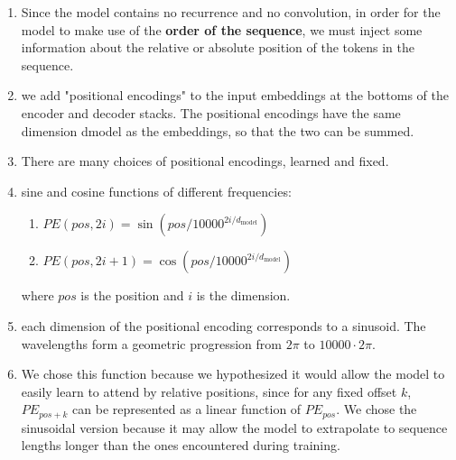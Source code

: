 \begin{enumerate}
    \item Since the model contains no recurrence and no convolution, in order for the model to make use of the \textbf{order of the sequence}, we must inject some information about the relative or absolute position of the tokens in the sequence.
    \hfill \cite{arxiv/1706.03762/Attention-Is-All-You-Need}

    \item we add "positional encodings" to the input embeddings at the bottoms of the encoder and decoder stacks.
    The positional encodings have the same dimension dmodel as the embeddings, so that the two can be summed. 
    \hfill \cite{arxiv/1706.03762/Attention-Is-All-You-Need}

    \item 
    There are many choices of positional encodings, learned and fixed.
    \hfill \cite{arxiv/1706.03762/Attention-Is-All-You-Need}

    \item sine and cosine functions of different frequencies:
    \hfill \cite{arxiv/1706.03762/Attention-Is-All-You-Need}
    \begin{enumerate}
        \item $ P E(pos,2i) = \sin(pos/10000^{2i/d_{\text{model}}}) $
        \hfill \cite{arxiv/1706.03762/Attention-Is-All-You-Need}

        \item $ P E(pos,2i+1) = \cos(pos/10000^{2i/d_{\text{model}}}) $
        \hfill \cite{arxiv/1706.03762/Attention-Is-All-You-Need}
    \end{enumerate}
    where $pos$ is the position and $i$ is the dimension.
    \hfill \cite{arxiv/1706.03762/Attention-Is-All-You-Need}

    \item each dimension of the positional encoding corresponds to a sinusoid. 
    The wavelengths form a geometric progression from $2\pi$ to $10000 \cdot 2\pi$.
    \hfill \cite{arxiv/1706.03762/Attention-Is-All-You-Need}

    \item We chose this function because we hypothesized it would allow the model to easily learn to attend by relative positions, since for any fixed offset $k$, $P E_{pos+k}$ can be represented as a linear function of $P E_{pos}$.
    We chose the sinusoidal version because it may allow the model to extrapolate to sequence lengths longer than the ones encountered during training.
    \hfill \cite{arxiv/1706.03762/Attention-Is-All-You-Need}
\end{enumerate}



















